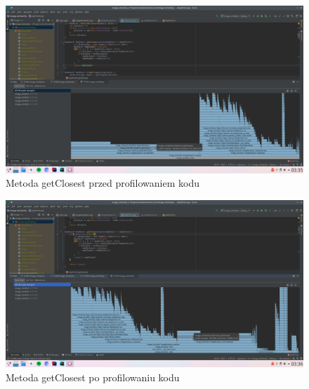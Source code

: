 \documentclass{article}
\begin{document}
	\begin{figure}[H]
		\centering
		\includegraphics[width=\linewidth]{before3.png}
		\caption{Metoda getClosest przed profilowaniem kodu}
		\label{fig:before2}
	\end{figure}
	\begin{figure}[H]
		\centering
		\includegraphics[width=\linewidth]{after3.png}
		\caption{Metoda getClosest po profilowaniu kodu}
		\label{fig:after2}
	\end{figure}
\end{document}
